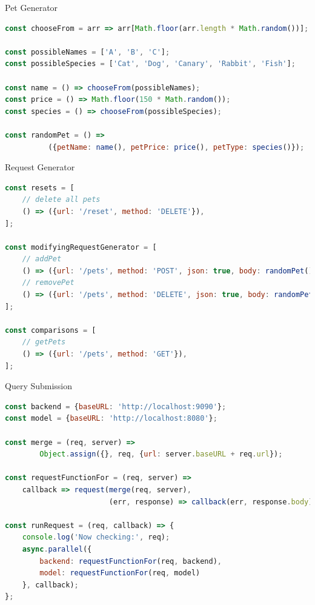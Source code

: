 \begin{frame}[fragile]{Pet Generator}

\begin{lstlisting}[language=JavaScript]
const chooseFrom = arr => arr[Math.floor(arr.length * Math.random())];

const possibleNames = ['A', 'B', 'C'];
const possibleSpecies = ['Cat', 'Dog', 'Canary', 'Rabbit', 'Fish'];

const name = () => chooseFrom(possibleNames);
const price = () => Math.floor(150 * Math.random());
const species = () => chooseFrom(possibleSpecies);

const randomPet = () => 
          ({petName: name(), petPrice: price(), petType: species()});
\end{lstlisting}

\end{frame}

\begin{frame}[fragile]{Request Generator}

\begin{lstlisting}[language=JavaScript]
const resets = [
    // delete all pets
    () => ({url: '/reset', method: 'DELETE'}),
];

const modifyingRequestGenerator = [
    // addPet
    () => ({url: '/pets', method: 'POST', json: true, body: randomPet()}),
    // removePet
    () => ({url: '/pets', method: 'DELETE', json: true, body: randomPet()})
];

const comparisons = [
    // getPets
    () => ({url: '/pets', method: 'GET'}),
];
\end{lstlisting}

\end{frame}

\begin{frame}[fragile]{Query Submission}

\begin{lstlisting}[language=JavaScript]
const backend = {baseURL: 'http://localhost:9090'};
const model = {baseURL: 'http://localhost:8080'};

const merge = (req, server) => 
        Object.assign({}, req, {url: server.baseURL + req.url});

const requestFunctionFor = (req, server) =>
    callback => request(merge(req, server), 
                        (err, response) => callback(err, response.body));

const runRequest = (req, callback) => {
    console.log('Now checking:', req);
    async.parallel({
        backend: requestFunctionFor(req, backend),
        model: requestFunctionFor(req, model)
    }, callback);
};
\end{lstlisting}

\end{frame}


